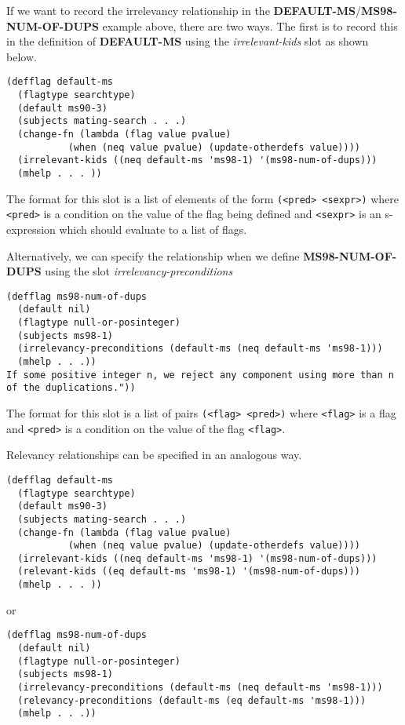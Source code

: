 If we want to record the irrelevancy relationship in
the {\bf DEFAULT-MS}/{\bf MS98-NUM-OF-DUPS} 
example above, there are two ways.  The first is to
record this in the definition of {\bf DEFAULT-MS} using the
{\it irrelevant-kids} slot as shown below.
\begin{verbatim}
(defflag default-ms
  (flagtype searchtype)
  (default ms90-3)
  (subjects mating-search . . .)
  (change-fn (lambda (flag value pvalue)
	       (when (neq value pvalue) (update-otherdefs value))))
  (irrelevant-kids ((neq default-ms 'ms98-1) '(ms98-num-of-dups)))
  (mhelp . . . ))
\end{verbatim}
The format for this slot is a list of elements of the form
\verb+(<pred> <sexpr>)+
where \verb+<pred>+ is a condition on the value of the flag
being defined
and \verb+<sexpr>+ is an s-expression
which should evaluate to a list of flags.

Alternatively, we can specify the relationship when
we define {\bf MS98-NUM-OF-DUPS} using the slot {\it irrelevancy-preconditions}
\begin{verbatim}
(defflag ms98-num-of-dups
  (default nil)
  (flagtype null-or-posinteger)
  (subjects ms98-1)
  (irrelevancy-preconditions (default-ms (neq default-ms 'ms98-1)))
  (mhelp . . .))
If some positive integer n, we reject any component using more than n 
of the duplications."))
\end{verbatim}
The format for this slot is a list of pairs \verb+(<flag> <pred>)+
where \verb+<flag>+ is a flag and \verb+<pred>+
is a condition on the value of the flag \verb+<flag>+.

Relevancy relationships can be specified in an analogous way.
\begin{verbatim}
(defflag default-ms
  (flagtype searchtype)
  (default ms90-3)
  (subjects mating-search . . .)
  (change-fn (lambda (flag value pvalue)
	       (when (neq value pvalue) (update-otherdefs value))))
  (irrelevant-kids ((neq default-ms 'ms98-1) '(ms98-num-of-dups)))
  (relevant-kids ((eq default-ms 'ms98-1) '(ms98-num-of-dups)))
  (mhelp . . . ))
\end{verbatim}
or
\begin{verbatim}
(defflag ms98-num-of-dups
  (default nil)
  (flagtype null-or-posinteger)
  (subjects ms98-1)
  (irrelevancy-preconditions (default-ms (neq default-ms 'ms98-1)))
  (relevancy-preconditions (default-ms (eq default-ms 'ms98-1)))
  (mhelp . . .))
\end{verbatim}


